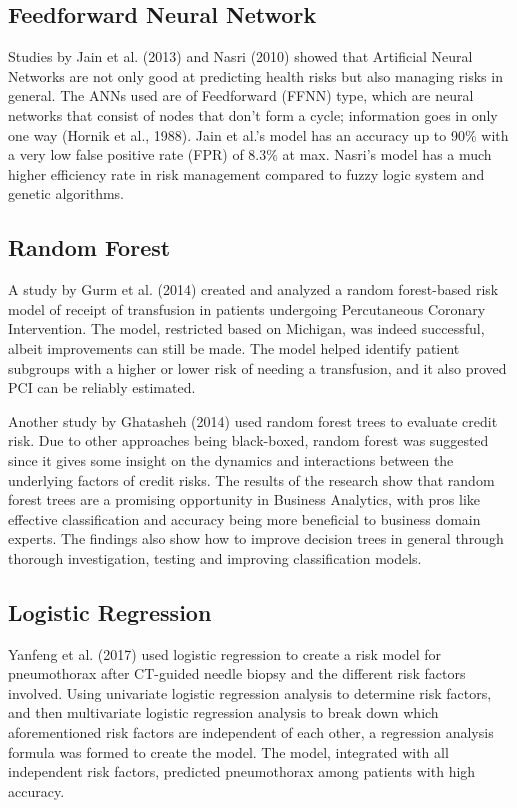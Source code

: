 \documentclass[10pt,11pt,12pt,oneside]{book}
\begin{document}
        \subsection{Feedforward Neural Network}
        Studies by Jain et al. (2013) and Nasri (2010) showed that Artificial Neural Networks are not only good at predicting health risks but also managing risks in general. The ANNs used are of Feedforward (FFNN) type, which are neural networks that consist of nodes that don’t form a cycle; information goes in only one way (Hornik et al., 1988). Jain et al.’s model has an accuracy up to 90\% with a very low false positive rate (FPR) of 8.3\% at max. Nasri’s model has a much higher efficiency rate in risk management compared to fuzzy logic system and genetic algorithms. \cite{jain_singh_2013, nasri2010application}

        \subsection{Random Forest}
        A study by Gurm et al. (2014) created and analyzed a random forest-based risk model of receipt of transfusion in patients undergoing Percutaneous Coronary Intervention. The model, restricted based on Michigan, was indeed successful, albeit improvements can still be made. The model helped identify patient subgroups with a higher or lower risk of needing a transfusion, and it also proved PCI can be reliably estimated. \cite{Gurm2014}

        Another study by Ghatasheh (2014) used random forest trees to evaluate credit risk. Due to other approaches being black-boxed, random forest was suggested since it gives some insight on the dynamics and interactions between the underlying factors of credit risks. The results of the research show that random forest trees are a promising opportunity in Business Analytics, with pros like effective classification and accuracy being more beneficial to business domain experts. The findings also show how to improve decision trees in general through thorough investigation, testing and improving classification models. \cite{Ghatasheh2014BusinessAU}
        \subsection{Logistic Regression}
        Yanfeng et al. (2017) used logistic regression to create a risk model for pneumothorax after CT-guided needle biopsy and the different risk factors involved. Using univariate logistic regression analysis to determine risk factors, and then multivariate logistic regression analysis to break down which aforementioned risk factors are independent of each other, a regression analysis formula was formed to create the model. The model, integrated with all independent risk factors, predicted pneumothorax among patients with high accuracy. \cite{Zhao2017}
\end{document}
